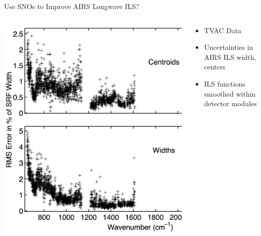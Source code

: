 \documentclass[10pt,t]{beamer}
\begin{document}
\begin{frame}[label={sec:orgdf19c22}]{Use SNOs to Improve AIRS Longwave ILS?}
  \begin{columns}
    \begin{column}{0.6\linewidth}
      \vspace{-0.2in}
      \begin{center}
        \includegraphics[width=\linewidth]{./center-width-rms-err.png}
      \end{center}
    \end{column}
    \begin{column}{0.5\linewidth}
      \vspace{-0.1in}
      \begin{itemize}
      \item TVAC Data
      \item Uncertainties in AIRS ILS width, centers
       \item ILS functions smoothed within detector modules
      \end{itemize}
    \end{column}
  \end{columns}

\end{frame}
\end{document}
